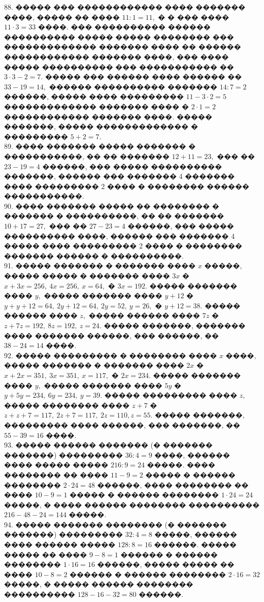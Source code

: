 \documentclass[12pt]{article}
\begin{document}
88. ����� ��� ������������ ���� ������� ����, ����� �� ���� $11:1=11,$ � � ��� ���� $11\cdot3=33$ ����. ��� ���������� ������ ���������� ����� ����� �������� ��� ������������� ������� ���� �� ������ ������������ ������� ����, ��� ���� ����� ���������� ��� ����������� �� $3\cdot3-2=7.$ ����� ��� ������ ���� ������ ��  $33-19=14,$ ������ ���������� ������� $14:7=2$ ������, ����� ���� ��������� $11-3\cdot2=5$ ������������� ������� ���� � $2\cdot1=2$ ������������ ������� ����. ����� �������, ����� ������������� � ��������� $5+2=7.$\\
89. ���� ������� ����� ������� � �����������, �� �� ������� $12+11=23,$ ��� �� $23-19=4$ ������, ��� ����� ���������� �������, ������ ��� ������� 4 ������� ���� ��������� 2 ���� � �������� ������ �����������.\\
90. ���� ������� ����� �� �������� � ������� � ����������, �� �� ������� $10+17=27,$ ��� �� $27-23=4$ ������, ��� ����� ���������� ����, ������ ��� ������� 4 ����� ���� ��������� 2 ���� � �������� ������� ������ � ����������.\\
91. ����� ������� � ������� ���� $x$ �����, ����� ����� � ������� ���� $3x$ � $x+3x=256,\ 4x=256,\ x=64,$ � $3x=192.$ ����� ������� ���� $y,$ ����� ������� ���� $y+12$ � $y+y+12=64,\ 2y+12=64,\ 2y=52,\ y=26,$ � $y+12=38.$ ����� ������ ���� $z,$ ����� ������ ���� $7z$ � $z+7z=192,\ 8z=192,\ z=24.$ ����� �������, ������� ���� ������� ������, ��� ������, �� $38-24=14$ ����.\\
92. ����� ��������� � �������� ���� $x$ ����, ����� ������� � ������� ���� $2x$ � $x+2x=351,\ 3x=351,\ x=117,$ � $2x=234.$ ����� ������� ���� $y,$ ����� ������� ���� $5y$ � $y+5y=234,\ 6y=234,\ y=39.$ ����� ��������� ���� $z,$ ����� �������� ���� $z+7$ � $z+z+7=117,\ 2z+7=117,\ 2z=110, z=55.$ ����� �������, ��������� ���� ������, ��� �������, �� $55-39=16$ ����.\\
93. ����� ������ ������� (� ������� �������) ��������� $36:4=9$ ����, ������ ���� ����� ����� $216:9=24$ �����. ���� �������� �� ���� $11-9=2$ ����� � ������ �������� $2\cdot24=48$ ������, ���� �������� �� ���� $10-9=1$ ����� � ������ �������� $1\cdot24=24$ �����, � ���� ������ �������� ���������� $216-48-24=144$ �����.\\
94. ����� ������� �������� (� ������� �������) ��������� $32:4=8$ �����, ������ ���� ������ ����� $128:8=16$ ������. ����� ����� �� ���� $9-8=1$ ������ � ������ �������� $1\cdot16=16$ ������, ����� ����� �� ���� $10-8=2$ ������ � ������ �������� $2\cdot16=32$ �����, � ����� ������ �������� ���������� $128-16-32=80$ ������.\\
\end{document}
